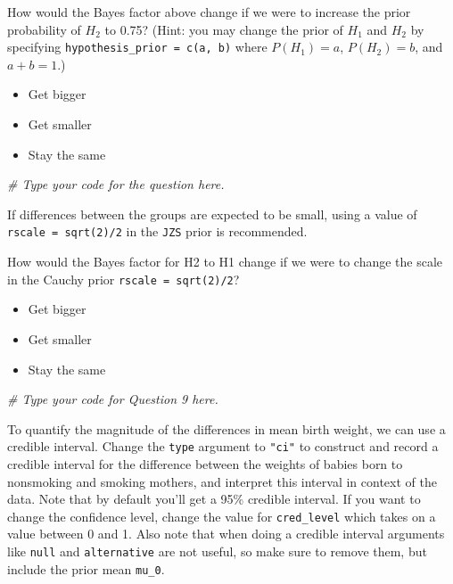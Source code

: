 \documentclass[]{article}
\newenvironment{Shaded}{\begin{snugshade}}{\end{snugshade}}
\newcommand{\CommentTok}[1]{\textcolor[rgb]{0.56,0.35,0.01}{\textit{#1}}}
\providecommand{\tightlist}{%
  \setlength{\itemsep}{0pt}\setlength{\parskip}{0pt}}
\begin{document}
How would the Bayes factor above change if we were to increase the prior
probability of \(H_2\) to 0.75? (Hint: you may change the prior of
\(H_1\) and \(H_2\) by specifying
\texttt{hypothesis\_prior\ =\ c(a,\ b)} where \(P(H_1) = a\),
\(P(H_2) = b\), and \(a+b = 1\).)

\begin{itemize}
\tightlist
\item
  Get bigger
\item
  Get smaller
\item
  Stay the same
\end{itemize}

\begin{Shaded}
\begin{Highlighting}[]
\CommentTok{# Type your code for the question here.}
\end{Highlighting}
\end{Shaded}

If differences between the groups are expected to be small, using a
value of \texttt{rscale\ =\ sqrt(2)/2} in the \texttt{JZS} prior is
recommended.

How would the Bayes factor for H2 to H1 change if we were to change the
scale in the Cauchy prior \texttt{rscale\ =\ sqrt(2)/2}?

\begin{itemize}
\tightlist
\item
  Get bigger
\item
  Get smaller
\item
  Stay the same
\end{itemize}

\begin{Shaded}
\begin{Highlighting}[]
\CommentTok{# Type your code for  Question 9 here.}
\end{Highlighting}
\end{Shaded}

To quantify the magnitude of the differences in mean birth weight, we
can use a credible interval. Change the \texttt{type} argument to
\texttt{"ci"} to construct and record a credible interval for the
difference between the weights of babies born to nonsmoking and smoking
mothers, and interpret this interval in context of the data. Note that
by default you'll get a 95\% credible interval. If you want to change
the confidence level, change the value for \texttt{cred\_level} which
takes on a value between 0 and 1. Also note that when doing a credible
interval arguments like \texttt{null} and \texttt{alternative} are not
useful, so make sure to remove them, but include the prior mean
\texttt{mu\_0}.
\end{document}
